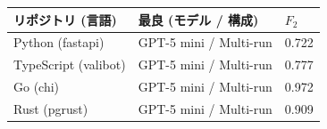 \begin{tabular}{@{}lll@{}}
\toprule
リポジトリ (言語) & 最良 (モデル / 構成) & $F_2$ \\
\midrule
Python (fastapi) & GPT-5 mini / Multi-run & 0.722 \\
TypeScript (valibot) & GPT-5 mini / Multi-run & 0.777 \\
Go (chi) & GPT-5 mini / Multi-run & 0.972 \\
Rust (pgrust) & GPT-5 mini / Multi-run & 0.909 \\
\bottomrule
\end{tabular}
